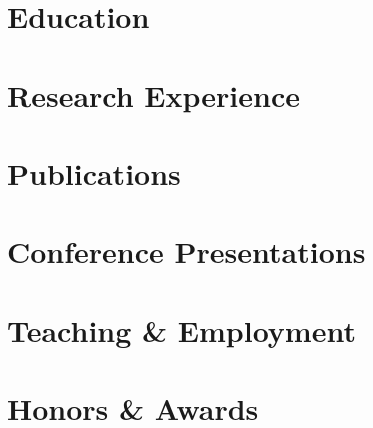 \documentclass{cv}
\begin{document}

    \section{Education}
        
        
    
    \vspace*{0.25cm}

    \section{Research Experience}
        
        \vspace*{0.1cm}
        
        \vspace*{0.1cm}
        
    
    \vspace*{0.25cm}
    
    \section{Publications}
        
        \vspace*{-0.25cm}

    \section{Conference Presentations}
        
    

    \section{Teaching \& Employment}
        
        
    
    \vspace*{0.25cm}

    \section{Honors \& Awards}
        
        
        \vspace*{0.1cm}
        
        \vspace*{0.1cm}
        
\end{document}
